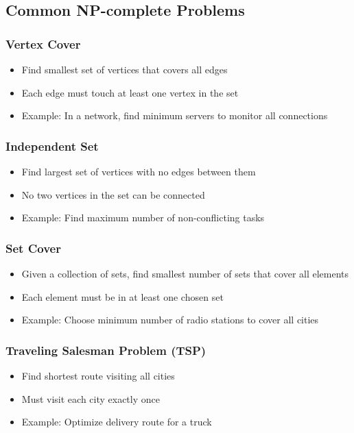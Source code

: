 \documentclass[11pt,a4paper]{article}
\begin{document}
\begin{multicols}{2}
\subsection{Common NP-complete Problems}
\subsubsection{Vertex Cover}
\begin{itemize}
    \item Find smallest set of vertices that covers all edges
    \item Each edge must touch at least one vertex in the set
    \item Example: In a network, find minimum servers to monitor all connections
\end{itemize}

\subsubsection{Independent Set}
\begin{itemize}
    \item Find largest set of vertices with no edges between them
    \item No two vertices in the set can be connected
    \item Example: Find maximum number of non-conflicting tasks
\end{itemize}

\subsubsection{Set Cover}
\begin{itemize}
    \item Given a collection of sets, find smallest number of sets that cover all elements
    \item Each element must be in at least one chosen set
    \item Example: Choose minimum number of radio stations to cover all cities
\end{itemize}

\subsubsection{Traveling Salesman Problem (TSP)}
\begin{itemize}
    \item Find shortest route visiting all cities
    \item Must visit each city exactly once
    \item Example: Optimize delivery route for a truck
\end{itemize}


\end{multicols}
\end{document}
